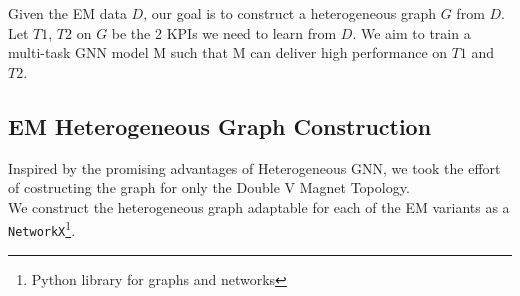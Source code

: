 \documentclass{report} %
\begin{document}
Given the \ac{EM} data \( D\), our goal is to construct a heterogeneous graph \( G\) from \( D\). Let \( T1\), \( T2\) on \( G\) be the 2 \ac{KPI}s we need to learn from \( D\). 
We aim to train a multi-task \ac{GNN} model M such that M can deliver high performance on \( T1\) and \( T2\).

\subsection{\ac{EM} Heterogeneous Graph Construction}\label{subsec:EM Heterogeneous Graph Construction}
Inspired by the promising advantages of Heterogeneous \ac{GNN}, we took the effort of costructing the graph for only the Double V Magnet Topology.\\
We construct the heterogeneous graph adaptable for each of the \ac{EM} variants as a  \texttt{NetworkX}\footnote{Python library for graphs and networks}.
\end{document}
